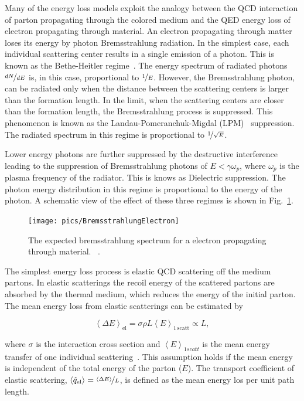 Many of the energy loss models exploit the analogy between the QCD interaction of parton propagating through the colored medium and the QED energy loss of electron propagating through material. An electron propagating through matter loses its energy by photon Bremsstrahlung radiation. In the simplest case, each individual scattering center results in a single emission of a photon. This is known as the Bethe-Heitler regime~\cite{BetheHeitler}. The energy spectrum of radiated photons $\nicefrac{dN}{dE}$ is, in this case, proportional to $\nicefrac{1}{E}$. However, the Bremsstrahlung photon, can be radiated only when the distance between the scattering centers is larger than the formation length. In the limit, when the scattering centers are closer than the formation length, the Bremsstrahlung process is suppressed. This phenomenon is known as the Landau-Pomeranchuk-Migdal (LPM)~\cite{Landau:1953um,Migdal:1956tc} suppression. The radiated spectrum in this regime is proportional to $\nicefrac{1}{\sqrt{E}}$.

Lower energy photons are further suppressed by the destructive interference leading to the suppression of Bremsstrahlung photons of $E < \gamma \omega_p$, where $\omega_p$ is the plasma frequency of the radiator. This is knows as Dielectric suppression. The photon energy distribution in this regime is proportional to the energy of the photon. A schematic view of the effect of these three regimes is shown in Fig.~\ref{fig:bremsstrahlung}.

\begin{figure}
\centering
\texttt{[image: pics/BremsstrahlungElectron]}
\caption[Photon spectrum]{ The expected bremsstrahlung spectrum for a electron propagating through material.  ~\cite{Bosted1993QuantummechanicalSO}. }
\label{fig:bremsstrahlung}
\end{figure}

The simplest energy loss process is elastic QCD scattering off the medium partons. In elastic scatterings the recoil energy of the scattered partons are absorbed by the thermal medium, which reduces the energy of the initial parton. The mean energy loss from elastic scatterings can be estimated by

\begin{equation}
\left<\Delta E\right>_{\mathrm{el}}=\sigma \rho L \left<E\right>_{\mathrm{1\,scatt}}\propto L,
\label{eq:elastic}
\end{equation}

\noindent where $\sigma$ is the interaction cross section and $\left<E\right>_{1 scatt}$ is the mean energy transfer of one individual scattering~\cite{Majumder:2010qh}. This assumption holds if the mean energy is independent of the total energy of the parton ($E$). The transport coefficient of elastic scattering, $\left< \hat q_\mathrm{el}\right> = \nicefrac{\left< \Delta E\right>}{L}$, is defined as the mean energy los per unit path length.

